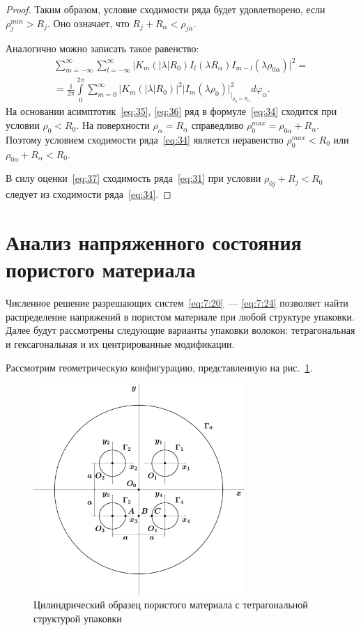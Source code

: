 \begin{proof}
Таким образом, условие сходимости ряда будет удовлетворено, если $\rho_j^{min}>R_j$. Оно означает, что $R_j+R_\alpha<\rho_{j\alpha}$.{\sloppy\par}

Аналогично можно записать такое равенство:
\begin{multline}
\sum\limits_{m=-\infty}^\infty\sum\limits_{l=-\infty}^\infty\bigg|K_m(|\lambda| R_0)I_l(\lambda R_\alpha)I_{m-l}(\lambda\rho_{0\alpha})\bigg|^2=\\
=\frac{1}{2\pi}\int\limits_0^{2\pi}\sum\limits_{m=0}^\infty\bigg|K_m(|\lambda|R_0)\bigg|^2\bigg|I_m(\lambda\rho_0)\bigg|_{|_{\rho_\alpha=R_\alpha}}^2d\varphi_\alpha.
\label{eq:34}
\end{multline}
На основании асимптотик~\eqref{eq:35}, \eqref{eq:36} ряд в формуле~\eqref{eq:34} сходится при условии $\rho_0<R_0$. На поверхности $\rho_\alpha=R_\alpha$ справедливо $\rho_0^{max}=\rho_{0\alpha}+R_\alpha$. Поэтому условием сходимости ряда~\eqref{eq:34} является неравенство $\rho_0^{max}<R_0$ или $\rho_{0\alpha}+R_\alpha<R_0$.

В силу оценки~\eqref{eq:37} сходимость ряда~\eqref{eq:31} при условии $\rho_{0j}+R_j<R_0$ следует из сходимости ряда~\eqref{eq:34}.
\end{proof}


\section{Анализ напряженного состояния пористого материала}

Численное решение разрешающих систем~\eqref{eq:7:20}~--- \eqref{eq:7:24} позволяет найти распределение напряжений в пористом материале при любой структуре упаковки. Далее будут рассмотрены следующие варианты упаковки волокон: тетрагональная и гексагональная и их центрированные модификации.

Рассмотрим геометрическую конфигурацию, представленную на рис.~\ref{f:7:6}.

\begin{figure}[h!]
\centering
\includegraphics[width=8cm]{fig_7-6.pdf}
\caption{\centering Цилиндрический образец пористого материала с тетрагональной структурой упаковки}
\label{f:7:6}
\end{figure}

